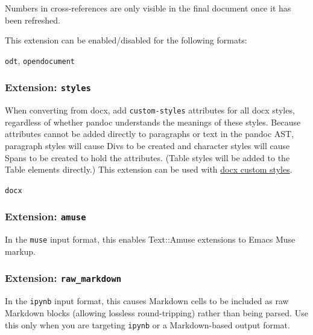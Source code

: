 \documentclass[
]{article}
\providecommand{\tightlist}{%
  \setlength{\itemsep}{0pt}\setlength{\parskip}{0pt}}
\begin{document}
Numbers in cross-references are only visible in the final document once
it has been refreshed.

This extension can be enabled/disabled for the following formats:

\begin{description}
\tightlist
\item[output formats]
\texttt{odt}, \texttt{opendocument}
\end{description}

\hypertarget{ext-styles}{%
\subsubsection{\texorpdfstring{Extension:
\texttt{styles}}{Extension: styles}}\label{ext-styles}}

When converting from docx, add \texttt{custom-styles} attributes for all
docx styles, regardless of whether pandoc understands the meanings of
these styles. Because attributes cannot be added directly to paragraphs
or text in the pandoc AST, paragraph styles will cause Divs to be
created and character styles will cause Spans to be created to hold the
attributes. (Table styles will be added to the Table elements directly.)
This extension can be used with \protect\hyperlink{custom-styles}{docx
custom styles}.

\begin{description}
\tightlist
\item[input formats]
\texttt{docx}
\end{description}

\hypertarget{extension-amuse}{%
\subsubsection{\texorpdfstring{Extension:
\texttt{amuse}}{Extension: amuse}}\label{extension-amuse}}

In the \texttt{muse} input format, this enables Text::Amuse extensions
to Emacs Muse markup.

\hypertarget{extension-raw_markdown}{%
\subsubsection{\texorpdfstring{Extension:
\texttt{raw\_markdown}}{Extension: raw\_markdown}}\label{extension-raw_markdown}}

In the \texttt{ipynb} input format, this causes Markdown cells to be
included as raw Markdown blocks (allowing lossless round-tripping)
rather than being parsed. Use this only when you are targeting
\texttt{ipynb} or a Markdown-based output format.
\end{document}
